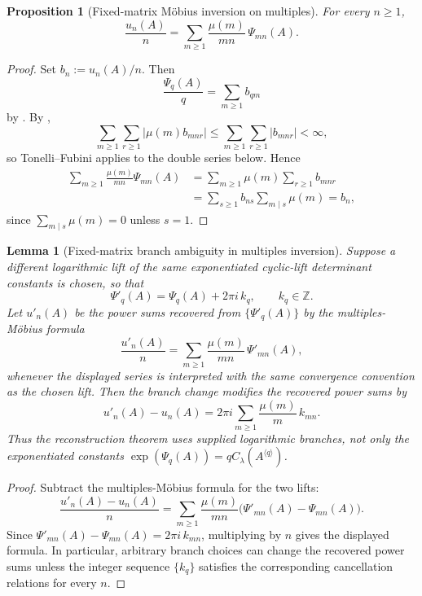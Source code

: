 \documentclass[11pt,a4paper]{amsart}
\theoremstyle{plain}
\newtheorem{proposition}[theorem]{Proposition}
\newtheorem{lemma}[theorem]{Lemma}
\theoremstyle{definition}
\theoremstyle{remark}
\newcommand{\ZZ}{\mathbb{Z}}
\newcommand{\abs}[1]{\lvert #1 \rvert}
\begin{document}
\begin{proposition}[Fixed-matrix M\"obius inversion on multiples]
  \label{prop:finite-part-cyclic-lift-mobius-inversion}
  For every \(n\ge 1\),
  \[
    \frac{u_n(A)}{n}
    =\sum_{m\ge 1}\frac{\mu(m)}{mn}\,\Psi_{mn}(A).
  \]
\end{proposition}

\begin{proof}
  Set \(b_n:=u_n(A)/n\). Then
  \[
    \frac{\Psi_q(A)}{q}
    =\sum_{m\ge 1}b_{qm}
  \]
  by . By
  ,
  \[
    \sum_{m\ge 1}\sum_{r\ge 1}\abs{\mu(m)b_{mnr}}
    \le
    \sum_{m\ge 1}\sum_{r\ge 1}\abs{b_{mnr}}
    <\infty,
  \]
  so Tonelli--Fubini applies to the double series below. Hence
  \begin{align*}
    \sum_{m\ge 1}\frac{\mu(m)}{mn}\Psi_{mn}(A)
    &=
    \sum_{m\ge 1}\mu(m)\sum_{r\ge 1}b_{mnr} \\
    &=
    \sum_{s\ge 1}b_{ns}\sum_{m\mid s}\mu(m)
    =b_n,
  \end{align*}
  since \(\sum_{m\mid s}\mu(m)=0\) unless \(s=1\).
\end{proof}

\begin{lemma}[Fixed-matrix branch ambiguity in multiples
  inversion]
  \label{lem:cyclic-lift-branch-ambiguity}
  Suppose a different logarithmic lift of the same exponentiated
  cyclic-lift determinant constants is chosen, so that
  \[
    \Psi'_q(A)=\Psi_q(A)+2\pi i\,k_q,
    \qquad k_q\in\ZZ.
  \]
  Let \(u'_n(A)\) be the power sums recovered from \(\{\Psi'_q(A)\}\) by
  the multiples-M\"obius formula
  \[
    \frac{u'_n(A)}{n}
    =
    \sum_{m\ge1}\frac{\mu(m)}{mn}\,\Psi'_{mn}(A),
  \]
  whenever the displayed series is interpreted with the same convergence
  convention as the chosen lift. Then the branch change modifies the
  recovered power sums by
  \[
    u'_n(A)-u_n(A)
    =
    2\pi i\sum_{m\ge1}\frac{\mu(m)}{m}\,k_{mn}.
  \]
  Thus the reconstruction theorem uses supplied logarithmic branches,
  not only the exponentiated constants
  \(\exp(\Psi_q(A))=qC_\lambda(A^{\langle q\rangle})\).
\end{lemma}

\begin{proof}
  Subtract the multiples-M\"obius formula for the two lifts:
  \[
    \frac{u'_n(A)-u_n(A)}{n}
    =
    \sum_{m\ge1}\frac{\mu(m)}{mn}
      \bigl(\Psi'_{mn}(A)-\Psi_{mn}(A)\bigr).
  \]
  Since \(\Psi'_{mn}(A)-\Psi_{mn}(A)=2\pi i\,k_{mn}\), multiplying by
  \(n\) gives the displayed formula. In particular, arbitrary branch
  choices can change the recovered power sums unless the integer
  sequence \(\{k_q\}\) satisfies the corresponding cancellation
  relations for every \(n\).
\end{proof}
\end{document}

